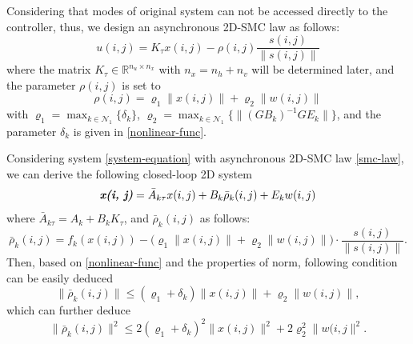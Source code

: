 \documentclass[journal,final,twocolumn]{IEEEtran}
\begin{document}
 	Considering that modes of original system can not be  accessed  directly to the controller,  thus, we design an asynchronous 2D-SMC law as follows:
	\begin{equation}\label{smc-law}
		u(i,j) = K_{\tau }x(i,j)-\rho(i,j)\frac{s(i,j)}{\|s(i,j)\|}
	\end{equation}
	where the matrix $K_{\tau }\in\mathbb{R}^{n_u\times n_x}$ with $n_x=n_h+n_v$ will be determined later, and the parameter $\rho(i,j)$ is set to
	\begin{equation}\label{varrho}
	\rho(i,j) = \varrho_{1}\|x(i,j)\| + \varrho_{2}\|w(i,j)\|
	\end{equation}
	with $\varrho_{1}=\max_{k\in\mathcal{N}_{1}} \{\delta_{k} \}$, $\varrho_{2} = \max_{k\in\mathcal{N}_{1}}\{\|(GB_{k})^{-1}GE_{k}\| \} $, and the parameter $\delta_{k}$ is given in \eqref{nonlinear-func}. 
	
	Considering system \eqref{system-equation} with asynchronous 2D-SMC law \eqref{smc-law}, we can derive the following closed-loop 2D system 
	\begin{equation} \label{closed-loop-system-equation}
	\emph{\textbf{x(i, j)}} = \bar{A}_{k\tau }x(i,j)+B_{k}\bar{\rho}_{k}(i,j)+E_{k}w(i,j)
	\end{equation}
	where $\bar{A}_{k\tau } = A_{k}+B_{k}K_{\tau }$, and $\bar{\rho}_{k}(i,j)$ as follows:
	\begin{equation*}
	\bar\rho_{k}(i,j)=f_{k}(x(i,j))-\big(\varrho_{1}\|x(i,j)\|+\varrho_{2}\|w(i,j)\|\big)\cdot\frac{s(i,j)}{\|s(i,j)\|}.
	\end{equation*}
	Then, based on \eqref{nonlinear-func} and the properties of norm, following condition can be easily deduced 
	\begin{equation}\label{norm-rho-inequality}
	\|\bar{\rho}_{k}(i,j)\| \leq (\varrho_{1}+\delta_{k})\|x(i,j)\| + \varrho_{2}\|w(i,j)\| ,
	\end{equation} 
	which can further deduce
	\begin{equation}\label{rholeseq}
	\|\bar{\rho}_{k}(i,j)\|^{2} \leq 2(\varrho_{1}+\delta_{k})^{2}\|x(i,j)\|^{2} +2\varrho_{2}^{2}\|w(i,j\|^{2} .
	\end{equation}	
	
\end{document}
